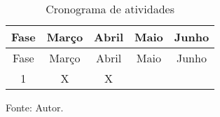 \begin{longtable}[]{@{}ccccc@{}}
\caption{Cronograma de atividades}\tabularnewline
\toprule
Fase & Março & Abril & Maio & Junho\tabularnewline
\midrule
\endfirsthead
\toprule
Fase & Março & Abril & Maio & Junho\tabularnewline
\midrule
\endhead
1 & X & X & &\tabularnewline
\bottomrule
\end{longtable}

Fonte: Autor.
